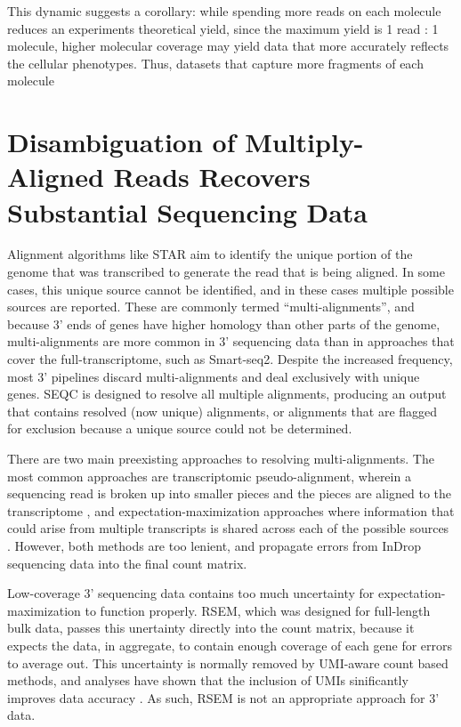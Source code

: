 This dynamic suggests a corollary: while spending more reads on each molecule reduces an experiments theoretical yield, since the maximum yield is 1 read : 1 molecule, higher molecular coverage may yield data that more accurately reflects the cellular phenotypes. 
Thus, datasets that capture more fragments of each molecule  

\section{Disambiguation of Multiply-Aligned Reads Recovers Substantial Sequencing Data}

Alignment algorithms like STAR aim to identify the unique portion of the genome that was transcribed to generate the read that is being aligned. 
In some cases, this unique source cannot be identified, and in these cases multiple possible sources are reported. 
These are commonly termed ``multi-alignments'', and because 3' ends of genes have higher homology than other parts of the genome, multi-alignments are more common in 3' sequencing data than in approaches that cover the full-transcriptome, such as Smart-seq2. 
Despite the increased frequency, most 3' pipelines discard multi-alignments and deal exclusively with unique genes. 
SEQC is designed to resolve all multiple alignments, producing an output that contains resolved (now unique) alignments, or alignments that are flagged for exclusion because a unique source could not be determined.

There are two main preexisting approaches to resolving multi-alignments. 
The most common approaches are transcriptomic pseudo-alignment, wherein a sequencing read is broken up into smaller pieces and the pieces are aligned to the transcriptome \citep{Patro2017,Bray2016}, and expectation-maximization approaches where information that could arise from multiple transcripts is shared across each of the possible sources \citep{Li2011}.
However, both methods are too lenient, and propagate errors from InDrop sequencing data into the final count matrix. 

Low-coverage 3' sequencing data contains too much uncertainty for expectation-maximization to function properly. 
RSEM, which was designed for full-length bulk data, passes this unertainty directly into the count matrix, because it expects the data, in aggregate, to contain enough coverage of each gene for errors to average out. 
This uncertainty is normally removed by UMI-aware count based methods, and analyses have shown that the inclusion of UMIs sinificantly improves data accuracy \citep{Grun2016}.
As such, RSEM is not an appropriate approach for 3' data. 

